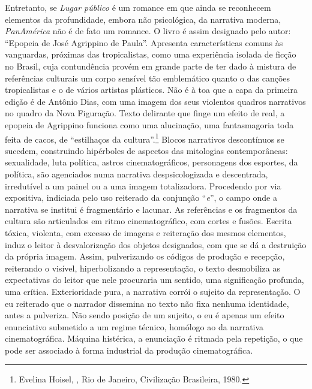 Entretanto, se \emph{Lugar público} é um romance em que ainda se
reconhecem elementos da profundidade, embora não psicológica, da
narrativa moderna, \emph{PanAmérica} não é de fato um romance. O livro é
assim designado pelo autor: ``Epopeia de José Agrippino de Paula''.
Apresenta características comuns às vanguardas, próximas das
tropicalistas, como uma experiência isolada de ficção no Brasil, cuja
contundência provém em grande parte de ter dado à mistura de referências
culturais um corpo sensível tão emblemático quanto o das canções
tropicalistas e o de vários artistas plásticos. Não é à toa que a capa
da primeira edição é de Antônio Dias, com uma imagem dos seus violentos
quadros narrativos no quadro da Nova Figuração. Texto delirante
que finge um efeito de real, a epopeia de Agrippino funciona como uma
alucinação, uma fantasmagoria toda feita de cacos, de ``estilhaços da
cultura''.\footnote{Evelina Hoisel, {}, Rio de Janeiro, Civilização
  Brasileira, 1980.} Blocos narrativos descontínuos se sucedem,
construindo hipérboles de aspectos das mitologias contemporâneas:
sexualidade, luta política, astros cinematográficos, personagens dos
esportes, da política, são agenciados numa narrativa despsicologizada e
descentrada, irredutível a um painel ou a uma imagem totalizadora.
Procedendo por via expositiva, indiciada pelo uso reiterado da conjunção
``\emph{e}'', o campo onde a narrativa se institui é fragmentário e
lacunar. As referências e os fragmentos da cultura são articulados em
ritmo cinematográfico, com cortes e fusões. Escrita tóxica, violenta,
com excesso de imagens e reiteração dos mesmos elementos, induz o leitor
à desvalorização dos objetos designados, com que se dá a destruição da
própria imagem. Assim, pulverizando os códigos de produção e recepção,
reiterando o visível, hiperbolizando a representação, o texto
desmobiliza as expectativas do leitor que nele procuraria um sentido,
uma significação profunda, uma crítica. Exterioridade pura, a narrativa
corrói o sujeito da representação. O eu reiterado que o narrador
dissemina no texto não fixa nenhuma identidade, antes a pulveriza. Não
sendo posição de um sujeito, o eu é apenas um efeito enunciativo
submetido a um regime técnico, homólogo ao da narrativa cinematográfica.
Máquina histérica, a enunciação é ritmada pela repetição, o que pode ser
associado à forma industrial da produção cinematográfica.

